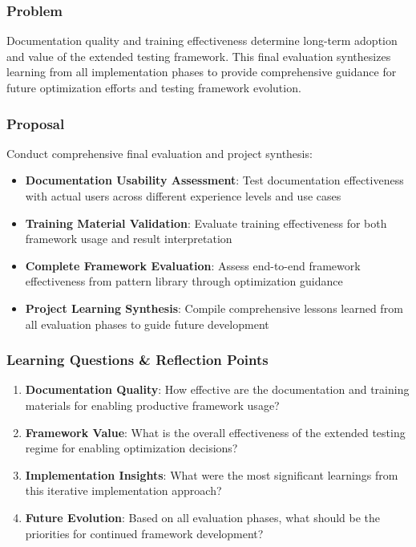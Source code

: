 \documentclass[11pt,a4paper]{article}
\begin{document}
\subsubsection{Problem}
Documentation quality and training effectiveness determine long-term adoption and value of the extended testing framework. This final evaluation synthesizes learning from all implementation phases to provide comprehensive guidance for future optimization efforts and testing framework evolution.

\subsubsection{Proposal}
Conduct comprehensive final evaluation and project synthesis:
\begin{itemize}
    \item \textbf{Documentation Usability Assessment}: Test documentation effectiveness with actual users across different experience levels and use cases
    \item \textbf{Training Material Validation}: Evaluate training effectiveness for both framework usage and result interpretation
    \item \textbf{Complete Framework Evaluation}: Assess end-to-end framework effectiveness from pattern library through optimization guidance
    \item \textbf{Project Learning Synthesis}: Compile comprehensive lessons learned from all evaluation phases to guide future development
\end{itemize}

\subsubsection{Learning Questions \& Reflection Points}
\begin{enumerate}
    \item \textbf{Documentation Quality}: How effective are the documentation and training materials for enabling productive framework usage?
    \item \textbf{Framework Value}: What is the overall effectiveness of the extended testing regime for enabling optimization decisions?
    \item \textbf{Implementation Insights}: What were the most significant learnings from this iterative implementation approach?
    \item \textbf{Future Evolution}: Based on all evaluation phases, what should be the priorities for continued framework development?
\end{enumerate}
\end{document}
